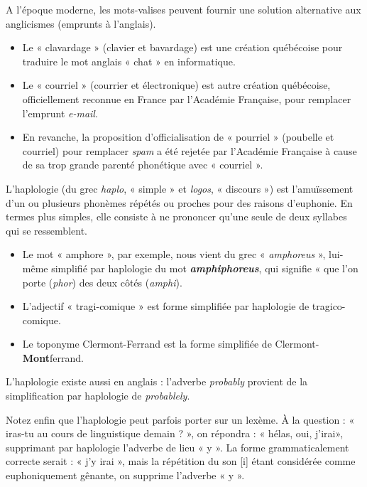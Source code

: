 A l’époque moderne, les mots-valises peuvent fournir une solution alternative aux anglicismes (emprunts à l’anglais).
\begin{itemize}
\item Le « clavardage » (clavier et bavardage) est une création québécoise pour traduire le mot anglais « chat » en informatique.
\item Le « courriel » (courrier et électronique) est autre création québécoise, officiellement reconnue en France par l’Académie Française, pour remplacer l’emprunt \textit{e-mail}.
\item En revanche, la proposition d’officialisation de « pourriel » (poubelle et courriel) pour remplacer \textit{spam} a été rejetée par l’Académie Française à cause de sa trop grande parenté phonétique avec « courriel ».
\end{itemize}

L’haplologie (du grec \textit{haplo}, « simple » et \textit{logos}, « discours ») est l’amuïssement d’un ou plusieurs phonèmes répétés ou proches pour des raisons d’euphonie. En termes plus simples, elle consiste à ne prononcer qu’une seule de deux syllabes qui se ressemblent.
\begin{itemize}
\item Le mot « amphore », par exemple, nous vient du grec « \textit{amphoreus} », lui-même simplifié par haplologie du mot \textbf{\textit{amphiphoreus}}, qui signifie « que l’on porte (\textit{phor}) des deux côtés (\textit{amphi}).
\item L’adjectif « tragi-comique » est forme simplifiée par haplologie de tragico-comique.
\item Le toponyme Clermont-Ferrand est la forme simplifiée de Clermont-\textbf{Mont}ferrand.
\end{itemize}
L’haplologie existe aussi en anglais : l’adverbe \textit{probably} provient de la simplification par haplologie de \textit{probablely}.

Notez enfin que l’haplologie peut parfois porter sur un lexème. À la question : « iras-tu au cours de linguistique demain ? », on répondra : « hélas, oui, j’irai», supprimant par haplologie l’adverbe de lieu « y ». La forme grammaticalement correcte serait : « j’y irai », mais la répétition du son [i] étant considérée comme euphoniquement gênante, on supprime l’adverbe « y ».

